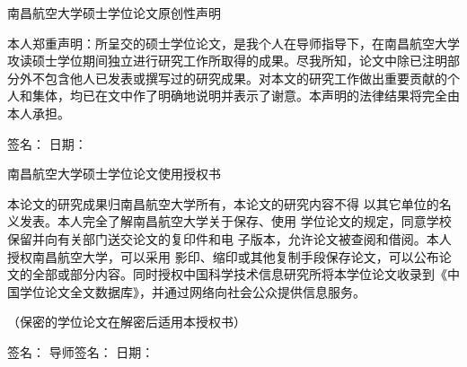 \documentclass[../article.tex]{subfiles} %
\begin{document}
{
\newpage
\thispagestyle{empty}
\thispagestyle{empty}

\begin{center}
    \vspace{21.6pt}
     {\fontsize{18}{21.6}\selectfont\heiti  南昌航空大学硕士学位论文原创性声明}
\end{center}
\vspace{12.6pt}
\begin{spacing}{1.9}
本人郑重声明：所呈交的硕士学位论文，是我个人在导师指导下，在南昌航空大学攻读硕士学位期间独立进行研究工作所取得的成果。尽我所知，论文中除已注明部分外不包含他人已发表或撰写过的研究成果。对本文的研究工作做出重要贡献的个人和集体，均已在文中作了明确地说明并表示了谢意。本声明的法律结果将完全由本人承担。
\end{spacing}

\vspace{16.8pt}
{ 签名：\underline{\hspace{5cm}} \hspace{1cm} 日期：\underline{\hspace{5cm}}}

\vspace{34.2pt}

\begin{center}
    {\fontsize{18}{21.6}\selectfont\heiti  南昌航空大学硕士学位论文使用授权书}
\end{center}
\vspace{16.8pt}
\begin{spacing}{1.9}
本论文的研究成果归南昌航空大学所有，本论文的研究内容不得
以其它单位的名义发表。本人完全了解南昌航空大学关于保存、使用
学位论文的规定，同意学校保留并向有关部门送交论文的复印件和电
子版本，允许论文被查阅和借阅。本人授权南昌航空大学，可以采用
影印、缩印或其他复制手段保存论文，可以公布论文的全部或部分内容。同时授权中国科学技术信息研究所将本学位论文收录到《中国学位论文全文数据库》，并通过网络向社会公众提供信息服务。
\end{spacing}

{（保密的学位论文在解密后适用本授权书）}

\vspace{16.8pt}
{ \noindent
签名：\underline{\hspace{3cm}} 导师签名：\underline{\hspace{3cm}} 日期：\underline{\hspace{3cm}}}

}
\end{document}
